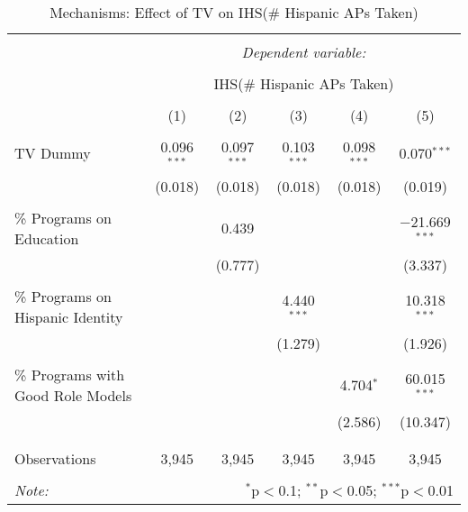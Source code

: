
\begin{table}[!htbp] \centering 
  \caption{Mechanisms: Effect of TV on IHS(\# Hispanic APs Taken)} 
  \label{} 
\begin{tabular}{@{\extracolsep{-2pt}}lccccc} 
\\[-1.8ex]\hline 
\hline \\[-1.8ex] 
 & \multicolumn{5}{c}{\textit{Dependent variable:}} \\ 
\cline{2-6} 
\\[-1.8ex] & \multicolumn{5}{c}{IHS(\# Hispanic APs Taken)} \\ 
\\[-1.8ex] & (1) & (2) & (3) & (4) & (5)\\ 
\hline \\[-1.8ex] 
 TV Dummy & 0.096$^{***}$ & 0.097$^{***}$ & 0.103$^{***}$ & 0.098$^{***}$ & 0.070$^{***}$ \\ 
  & (0.018) & (0.018) & (0.018) & (0.018) & (0.019) \\ 
  & & & & & \\ 
 \% Programs on Education &  & 0.439 &  &  & $-$21.669$^{***}$ \\ 
  &  & (0.777) &  &  & (3.337) \\ 
  & & & & & \\ 
 \% Programs on Hispanic Identity &  &  & 4.440$^{***}$ &  & 10.318$^{***}$ \\ 
  &  &  & (1.279) &  & (1.926) \\ 
  & & & & & \\ 
 \% Programs with Good Role Models &  &  &  & 4.704$^{*}$ & 60.015$^{***}$ \\ 
  &  &  &  & (2.586) & (10.347) \\ 
  & & & & & \\ 
\hline \\[-1.8ex] 
Observations & 3,945 & 3,945 & 3,945 & 3,945 & 3,945 \\ 
\hline 
\hline \\[-1.8ex] 
\textit{Note:}  & \multicolumn{5}{r}{$^{*}$p$<$0.1; $^{**}$p$<$0.05; $^{***}$p$<$0.01} \\ 
\end{tabular} 
\end{table} 
